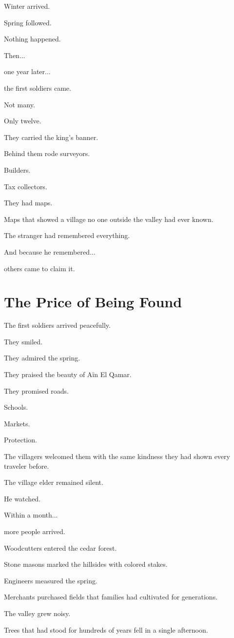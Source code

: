 \documentclass[12pt,openany]{book}
\begin{document}
Winter arrived.

Spring followed.

Nothing happened.

Then...

one year later...

the first soldiers came.

Not many.

Only twelve.

They carried the king's banner.

Behind them rode surveyors.

Builders.

Tax collectors.

They had maps.

Maps that showed a village no one outside the valley had ever known.

The stranger had remembered everything.

And because he remembered...

others came to claim it.
\section*{The Price of Being Found}

The first soldiers arrived peacefully.

They smiled.

They admired the spring.

They praised the beauty of Aïn El Qamar.

They promised roads.

Schools.

Markets.

Protection.

The villagers welcomed them with the same kindness they had shown every traveler before.

The village elder remained silent.

He watched.

Within a month...

more people arrived.

Woodcutters entered the cedar forest.

Stone masons marked the hillsides with colored stakes.

Engineers measured the spring.

Merchants purchased fields that families had cultivated for generations.

The valley grew noisy.

Trees that had stood for hundreds of years fell in a single afternoon.
\end{document}
